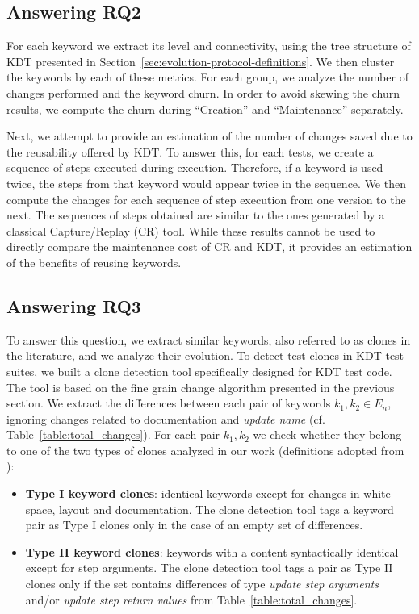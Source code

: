 \subsection{Answering RQ2}
\label{sec:evolution-protocol-rq2}

For each keyword we extract its level and connectivity, using the tree structure of KDT presented in Section~\ref{sec:evolution-protocol-definitions}. We then cluster the keywords by each of these metrics. For each group, we analyze the number of changes performed and the keyword churn. In order to avoid skewing the churn results, we compute the churn during ``Creation'' and ``Maintenance'' separately.

Next, we attempt to provide an estimation of the number of changes saved due to the reusability offered by KDT. To answer this, for each tests, we create a sequence of steps executed during execution. Therefore, if a keyword is used twice, the steps from that keyword would appear twice in the sequence. We then compute the changes for each sequence of step execution from one version to the next. The sequences of steps obtained are similar to the ones generated by a classical Capture/Replay (CR) tool. While these results cannot be used to directly compare the maintenance cost of CR and KDT, it provides an estimation of the benefits of reusing keywords.

\subsection{Answering RQ3}
\label{sec:evolution-protocol-rq3}

To answer this question, we extract similar keywords, also referred to as clones in the literature, and we analyze their evolution. To detect test clones in KDT test suites, we built a clone detection tool specifically designed for KDT test code. The tool is based on the fine grain change algorithm presented in the previous section. We extract the differences between each pair of keywords $k_1, k_2 \in E_n$, ignoring changes related to documentation and \emph{update name} (cf. Table~\ref{table:total_changes}).  For each pair $k_1, k_2$ we check whether they belong to one of the two types of clones analyzed in our work (definitions adopted from \cite{Lavoie2017}):

\begin{itemize}
    \item \textbf{Type I keyword clones}: identical keywords except for changes in white space, layout and documentation. The clone detection tool tags a keyword pair as Type I clones only in the case of an empty set of differences.
  
    \item \textbf{Type II keyword clones}: keywords with a content syntactically  identical except for step arguments. The clone detection tool tags a pair as Type II clones only if the set contains differences of type \emph{update step arguments} and/or \emph{update step return values} from Table~\ref{table:total_changes}.
\end{itemize}

